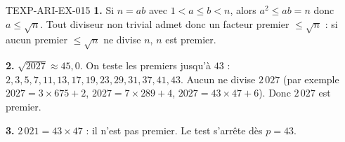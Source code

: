 \begin{corrige}{TEXP-ARI-EX-015}
\textbf{1.} Si $n=ab$ avec $1<a\leq b<n$, alors $a^2\leq ab=n$ donc
$a\leq\sqrt{n}$. Tout diviseur non trivial admet donc un facteur premier
$\leq\sqrt{n}$ : si aucun premier $\leq\sqrt{n}$ ne divise $n$, $n$ est premier.

\textbf{2.} $\sqrt{2027}\approx45{,}0$. On teste les premiers jusqu'à $43$ :
$2,3,5,7,11,13,17,19,23,29,31,37,41,43$. Aucun ne divise $2\,027$ (par
exemple $2027=3\times675+2$, $2027=7\times289+4$, $2027=43\times47+6$).
Donc $2\,027$ est premier.

\textbf{3.} $2\,021=43\times47$ : il n'est pas premier. Le test s'arrête dès
$p=43$.
\end{corrige}
